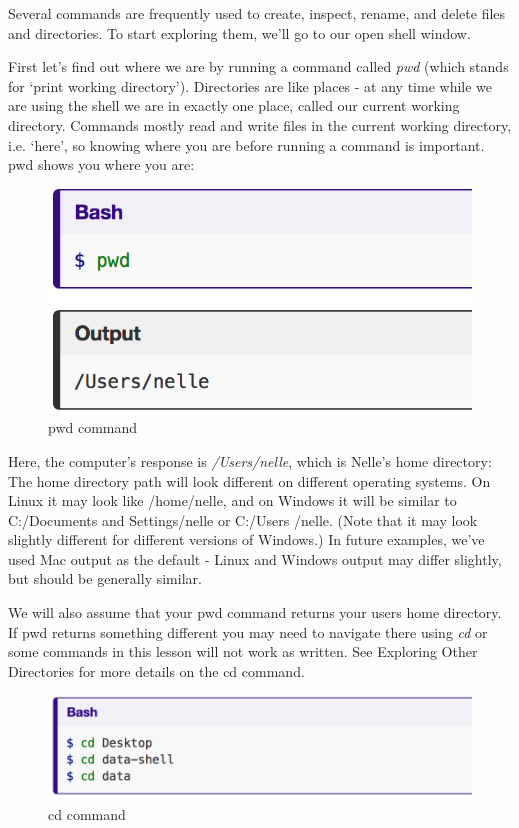 \documentclass[11pt]{book}
\begin{document}
Several commands are frequently used to create, inspect, rename, and delete files and directories. To start exploring them, we’ll go to our open shell window.

First let’s find out where we are by running a command called \emph{pwd} (which stands for ‘print working directory’). Directories are like places - at any time while we are using the shell we are in exactly one place, called our current working directory. Commands mostly read and write files in the current working directory, i.e. ‘here’, so knowing where you are before running a command is important. pwd shows you where you are:

\begin{figure}[!]
\includegraphics[scale=.6]{figures/pwd.png}
\caption{pwd command}
\end{figure}

Here, the computer’s response is \emph{/Users/nelle}, which is Nelle’s home directory:
The home directory path will look different on different operating systems. On Linux it may look like /home/nelle, and on Windows it will be similar to C:\slash Documents and Settings\slash nelle or C:\slash Users \slash nelle. (Note that it may look slightly different for different versions of Windows.) In future examples, we’ve used Mac output as the default - Linux and Windows output may differ slightly, but should be generally similar.

We will also assume that your pwd command returns your users home directory. If pwd returns something different you may need to navigate there using \emph{cd} or some commands in this lesson will not work as written. 
See Exploring Other Directories for more details on the cd command.

\begin{figure}[!]
\includegraphics[scale=.6]{figures/cd.png}
\caption{cd command}
\end{figure}
\end{document}
